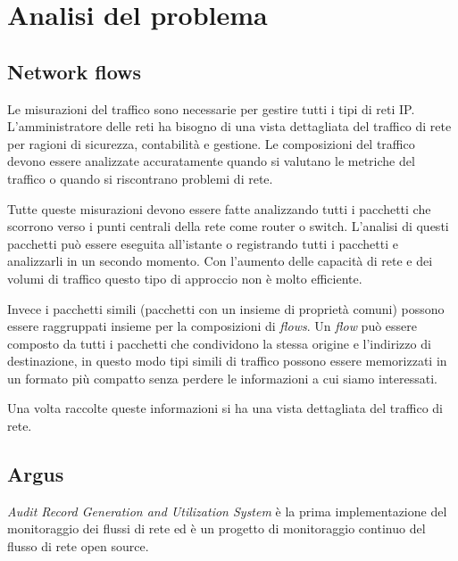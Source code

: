 \documentclass[../main.tex]{subfiles}
\begin{document}
\chapter{Analisi del problema}

\section{Network flows}
Le misurazioni del traffico sono necessarie per gestire tutti i tipi di reti IP. L'amministratore delle reti ha bisogno di una vista dettagliata del traffico di rete per ragioni di sicurezza, contabilità e gestione. Le composizioni del traffico devono essere analizzate accuratamente quando si valutano le metriche del traffico o quando si riscontrano problemi di rete.

Tutte queste misurazioni devono essere fatte analizzando tutti i pacchetti che scorrono verso i punti centrali della rete come router o switch. L'analisi di questi pacchetti può essere eseguita all'istante o registrando tutti i pacchetti e analizzarli in un secondo momento. Con l'aumento delle capacità di rete e dei volumi di traffico questo tipo di approccio non è molto efficiente. 

Invece i pacchetti simili (pacchetti con un insieme di proprietà comuni) possono essere raggruppati insieme per la composizioni di \textit{flows}. Un \textit{flow} può essere composto da tutti i pacchetti che condividono la stessa origine e l'indirizzo di destinazione, in questo modo tipi simili di traffico possono essere memorizzati in un formato più compatto senza perdere le informazioni a cui siamo interessati.

Una volta raccolte queste informazioni si ha una vista dettagliata del traffico di rete. 

\section{Argus}

\textit{Audit Record Generation and Utilization System} è la prima implementazione del monitoraggio dei flussi di rete ed è un progetto di monitoraggio continuo del flusso di rete open source. \newline
\end{document}
